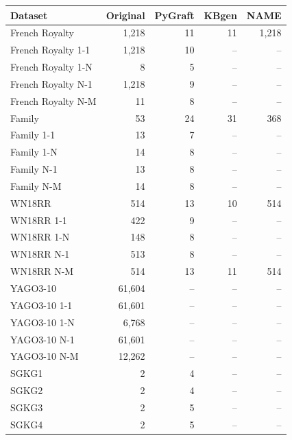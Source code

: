 \begin{tabular}{lrrrr}
\toprule
Dataset & Original & PyGraft & KBgen & NAME \\
\midrule
French Royalty & 1{,}218 & 11 & 11 & 1{,}218 \\
French Royalty 1-1 & 1{,}218 & 10 & – & – \\
French Royalty 1-N & 8 & 5 & – & – \\
French Royalty N-1 & 1{,}218 & 9 & – & – \\
French Royalty N-M & 11 & 8 & – & – \\
\midrule
Family & 53 & 24 & 31 & 368 \\
Family 1-1 & 13 & 7 & – & – \\
Family 1-N & 14 & 8 & – & – \\
Family N-1 & 13 & 8 & – & – \\
Family N-M & 14 & 8 & – & – \\
\midrule
WN18RR & 514 & 13 & 10 & 514 \\
WN18RR 1-1 & 422 & 9 & – & – \\
WN18RR 1-N & 148 & 8 & – & – \\
WN18RR N-1 & 513 & 8 & – & – \\
WN18RR N-M & 514 & 13 & 11 & 514 \\
\midrule
YAGO3-10 & 61{,}604 & – & – & – \\
YAGO3-10 1-1 & 61{,}601 & – & – & – \\
YAGO3-10 1-N & 6{,}768 & – & – & – \\
YAGO3-10 N-1 & 61{,}601 & – & – & – \\
YAGO3-10 N-M & 12{,}262 & – & – & – \\
\midrule
SGKG1 & 2 & 4 & – & – \\
SGKG2 & 2 & 4 & – & – \\
SGKG3 & 2 & 5 & – & – \\
SGKG4 & 2 & 5 & – & – \\
\bottomrule
\end{tabular}
